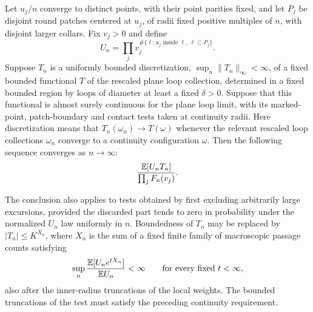 \begin{corollary}
\label{cor:macroscopic-test}
Let $u_j/n$ converge to distinct points, with their point parities
fixed, and let $P_j$ be disjoint round patches centered at $u_j$,
of radii fixed positive multiples of $n$, with disjoint larger
collars. Fix $v_j>0$ and define
\[
 U_n=\prod_jv_j^{\#\{\ell:u_j\text{ inside }\ell,\ \ell\subset P_j\}}.
\]
Suppose $T_n$ is a uniformly bounded discretization,
$\sup_n\|T_n\|_\infty<\infty$, of a fixed bounded functional $T$ of the
rescaled plane loop collection, determined in a fixed bounded region
by loops of diameter at least a fixed $\delta>0$. Suppose that this
functional is almost surely continuous for the plane loop limit,
with its marked-point, patch-boundary and contact tests taken at
continuity radii. Here discretization means that
$T_n(\omega_n)\to T(\omega)$ whenever the relevant rescaled
loop collections $\omega_n$ converge to a continuity configuration
$\omega$. Then the following sequence converges as $n\to\infty$:
\begin{equation}\label{eq:radial-macroscopic-test}
 \frac{\mathbb E[U_nT_n]}{\prod_jF_n(v_j)}.
\end{equation}

The conclusion also applies to tests obtained by first excluding
arbitrarily large excursions, provided the discarded part tends
to zero in probability under the normalized $U_n$ law uniformly
in $n$. Boundedness of $T_n$ may be replaced by
$|T_n|\le K^{X_n}$, where $X_n$ is the sum of a fixed finite family of
macroscopic passage counts satisfying
\begin{equation}\label{eq:radial-test-integrability}
 \sup_n\frac{\mathbb E[U_ne^{tX_n}]}{\mathbb E U_n}<\infty
 \qquad\text{for every fixed }t<\infty,
\end{equation}
also after the inner-radius truncations of the local weights.
The bounded truncations of the test must satisfy the preceding
continuity requirement.
\end{corollary}

